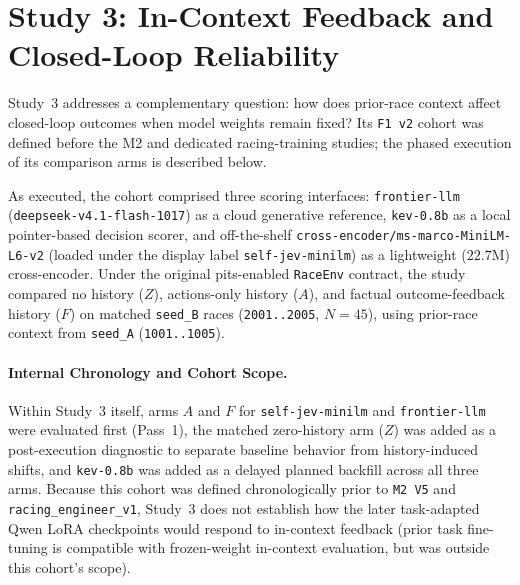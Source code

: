 \documentclass[11pt,a4paper]{article}
\begin{document}
\section{Study 3: In-Context Feedback and Closed-Loop Reliability}

Study~3 addresses a complementary question: how does prior-race context affect closed-loop outcomes when model weights remain fixed? Its \texttt{F1 v2} cohort was defined before the M2 and dedicated racing-training studies; the phased execution of its comparison arms is described below.

As executed, the cohort comprised three scoring interfaces: \texttt{frontier-llm} (\texttt{deepseek-v4.1-flash-1017}) as a cloud generative reference, \texttt{kev-0.8b} as a local pointer-based decision scorer, and off-the-shelf \nolinkurl{cross-encoder/ms-marco-MiniLM-L6-v2} (loaded under the display label \texttt{self-jev-minilm}) as a lightweight ($22.7$M) cross-encoder. Under the original pits-enabled \texttt{RaceEnv} contract, the study compared no history ($Z$), actions-only history ($A$), and factual outcome-feedback history ($F$) on matched \texttt{seed\_B} races (\texttt{2001..2005}, $N=45$), using prior-race context from \texttt{seed\_A} (\texttt{1001..1005}).

\paragraph{Internal Chronology and Cohort Scope.}
Within Study~3 itself, arms $A$ and $F$ for \texttt{self-jev-minilm} and \texttt{frontier-llm} were evaluated first (Pass~1), the matched zero-history arm ($Z$) was added as a post-execution diagnostic to separate baseline behavior from history-induced shifts, and \texttt{kev-0.8b} was added as a delayed planned backfill across all three arms. Because this cohort was defined chronologically prior to \texttt{M2 V5} and \texttt{racing\_engineer\_v1}, Study~3 does not establish how the later task-adapted Qwen LoRA checkpoints would respond to in-context feedback (prior task fine-tuning is compatible with frozen-weight in-context evaluation, but was outside this cohort's scope).
\end{document}
